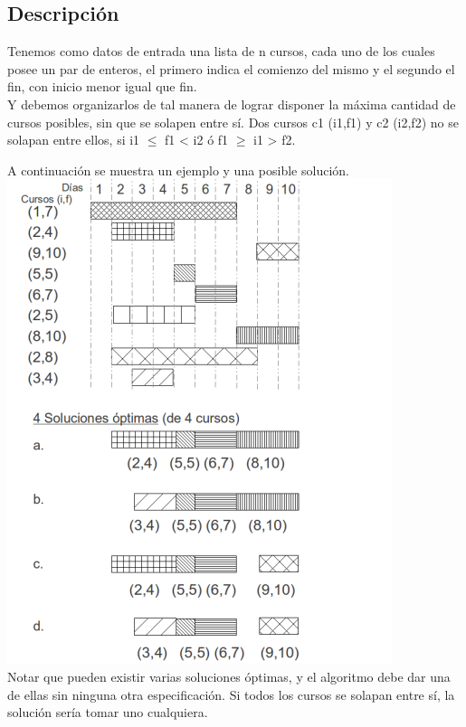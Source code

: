 \subsection{Descripci\'on}
Tenemos como datos de entrada una lista de n cursos, cada uno de los cuales posee un par de enteros, el primero indica el comienzo del mismo y el segundo el fin, con inicio menor igual que fin. \\
Y debemos organizarlos de tal manera de lograr disponer la máxima cantidad de cursos posibles, sin que se solapen entre sí. Dos cursos c1 (i1,f1) y c2 (i2,f2) no se solapan entre ellos, si i1 $\leq$ f1 <  i2  ó f1 $\geq$ i1 > f2.

A continuación se muestra un ejemplo y una posible solución.\\

\includegraphics[scale=1]{ej2/Graficos/ej2a400x480.png} \\

Notar que pueden existir varias soluciones óptimas, y el algoritmo debe dar una de ellas sin ninguna otra especificación. Si todos los cursos se solapan entre sí, la solución sería tomar uno cualquiera.\\